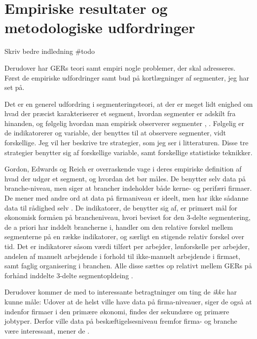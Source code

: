 \section{Empiriske resultater og metodologiske udfordringer  \label{AST_metodeogempiri}}


Skriv bedre indledning \#todo

Derudover har GERs teori samt empiri nogle problemer, der skal adresseres. Først de empiriske udfordringer samt bud på kortlægninger af segmenter, jeg har set på.

Det er en generel udfordring i segmenteringsteori, at der er meget lidt enighed om hvad der præcist karakteriserer et segment, hvordan segmenter er adskilt fra hinanden, og følgelig hvordan man empirisk observerer segmenter \parencite[71]{Leontaridi1998}, \parencite[1231]{Cain1976}. Følgelig er de indikatorerer og variable, der benyttes til at observere segmenter, vidt forskellige. Jeg vil her beskrive tre strategier, som jeg ser i litteraturen. Disse tre strategier benytter sig af forskellige variable, samt forskellige statistiske teknikker. 

Gordon, Edwards og Reich er overraskende vage i deres empiriske definition af hvad der udgør et segment, og hvordan det bør måles.
De benytter selv data på branche-niveau, men siger at brancher  indeholder både kerne- og perifæri firmaer. De mener med andre ord at data på firmaniveau er ideelt, men har ikke sådanne data til rådighed selv \parencite[193]{Gordon1982}. De indikatorer, de benytter sig af, er primært mål for økonomisk formåen på brancheniveau, hvori beviset for den 3-delte segmentering, de a priori har inddelt brancherne i, handler om den relative forskel mellem segmenterne på en række indikatorer, og særligt en stigende relativ forskel over tid. 
Det er indikatorer såsom værdi tilført per arbejder, lønforskelle per arbejder, andelen af manuelt arbejdende i forhold til ikke-manuelt arbejdende i firmaet, samt faglig organisering i branchen. Alle disse sættes op relativt mellem GERs på forhånd inddelte 3-delte segmentopldeing \parencite[193]{Gordon1982}. 

Derudover kommer de med to interessante betragtninger om ting de \emph{ikke} har kunne måle: Udover at de helst ville have data på firma-niveauer, siger de også at indenfor firmaer i den primære økonomi, findes der sekundære og primære jobtyper. Derfor ville data på beskæftigelsesniveau fremfor firma- og branche være interessant, mener de \parencite[193]{Gordon1982}. 

